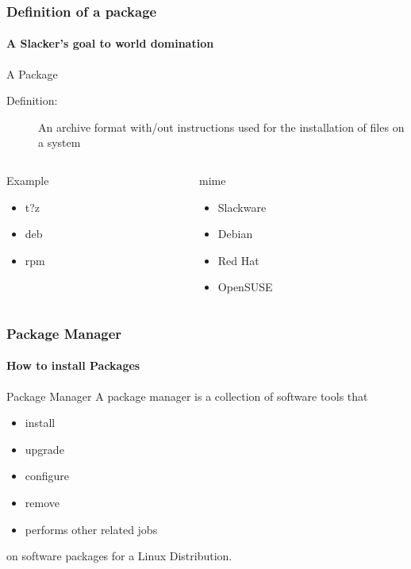 \documentclass[12pt,hyperref={pdfpagelabels=true}]{beamer}
\begin{document}
\begin{frame}
  \frametitle{Definition of a package}
  \framesubtitle{A Slacker's goal to world domination}
  \begin{block}{A Package}
    \begin{description}
    \item[Definition:] An archive format with/out instructions used for the
      installation of files on a system
    \end{description}
  \end{block}
  
  \pause
  
  \begin{columns}
    \begin{column}{4cm}
      \begin{block}{Example}
        \begin{itemize}[<+-| alert@+>]
        \item<2-> t?z
        \item<3-> deb
        \item<4-> rpm
        \end{itemize}
      \end{block}
    \end{column}
    
    \begin{column}{4cm}
      \begin{block}{mime}
        \begin{itemize}[<+-| alert@+>]
        \item<2-> Slackware
        \item<3-> Debian
        \item<4-> Red Hat
        \item<4-> OpenSUSE
        \end{itemize}
      \end{block}
    \end{column}
  \end{columns}
\end{frame}

\begin{frame}
  \frametitle{Package Manager}
  \framesubtitle{How to install Packages}
  \begin{block}{Package Manager}
    A package manager is a collection of software tools that
    \begin{itemize}[<+-| alert@+>]
    \item<2,7>install
    \item<3,7> upgrade
    \item<4,7> configure
    \item<5,7> remove
    \item<6,7> performs other related jobs
    \end{itemize}
    
    \pause
    
    on software packages for a Linux Distribution.
  \end{block}
\end{frame}
\end{document}
